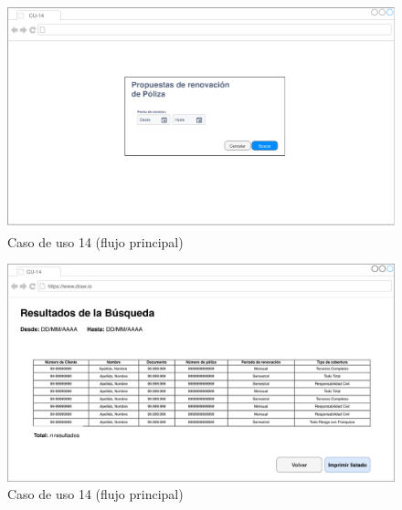 \documentclass[12pt]{article}
\begin{document}

\vfill
\begin{figure}[h!]
\includegraphics[width=\textwidth]{CU14/CU-141.pdf}
\caption{Caso de uso 14 (flujo principal)}
\end{figure}
\vfill

\vfill
\begin{figure}[h!]
\includegraphics[width=\textwidth]{CU14/CU-142.pdf}
\caption{Caso de uso 14 (flujo principal)}
\end{figure}
\vfill
\end{document}
